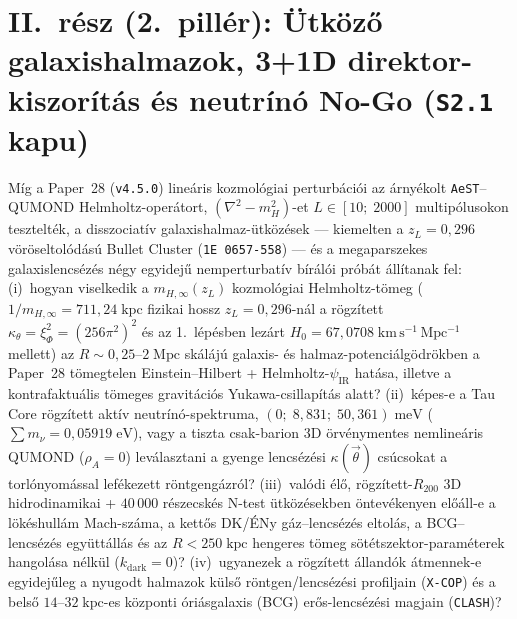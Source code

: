 \documentclass[11pt,a4paper]{article}
\begin{document}
\section{II.~rész (2.~pillér): Ütköző galaxishalmazok, 3+1D direktor-kiszorítás és neutrínó No-Go (\texttt{S2.1} kapu)}
\label{sec:step2-intro-hu}
Míg a Paper~28 (\texttt{v4.5.0}) lineáris kozmológiai perturbációi az árnyékolt \texttt{AeST}--QUMOND Helmholtz-operátort, $(\nabla^2 - m_H^2)$-et $L \in [10;\; 2000]$ multipólusokon tesztelték, a disszociatív galaxishalmaz-ütközések --- kiemelten a $z_L = 0{,}296$ vöröseltolódású Bullet Cluster (\texttt{1E~0657-558}) \cite{Markevitch2004,Clowe2006,Bradac2006,Randall2008,Cha2024} --- és a megaparszekes galaxislencsézés \cite{Mistele2024} négy egyidejű nemperturbatív bírálói próbát állítanak fel:
(i)~hogyan viselkedik a $m_{H,\infty}(z_L)$ kozmológiai Helmholtz-tömeg ($1/m_{H,\infty} = 711{,}24\;\mathrm{kpc}$ fizikai hossz $z_L = 0{,}296$-nál a rögzített $\kappa_\theta = \xi_\Phi^2 = (256\pi^2)^2$ és az 1.~lépésben lezárt $H_0 = 67{,}0708\;\mathrm{km\,s^{-1}\,Mpc^{-1}}$ mellett) az $R \sim 0{,}25\text{--}2\;\mathrm{Mpc}$ skálájú galaxis- és halmaz-potenciálgödrökben a Paper~28 tömegtelen Einstein--Hilbert + Helmholtz-$\psi_{\mathrm{IR}}$ hatása, illetve a kontrafaktuális tömeges gravitációs Yukawa-csillapítás alatt?
(ii)~képes-e a Tau Core rögzített aktív neutrínó-spektruma, $(0;\; 8{,}831;\; 50{,}361)\;\mathrm{meV}$ ($\sum m_\nu = 0{,}05919\;\mathrm{eV}$), vagy a tiszta csak-barion 3D örvénymentes nemlineáris QUMOND ($\rho_A = 0$) leválasztani a gyenge lencsézési $\kappa(\vec{\theta})$ csúcsokat a torlónyomással lefékezett röntgengázról?
(iii)~valódi élő, rögzített-$R_{200}$ 3D hidrodinamikai + $40\,000$ részecskés N-test ütközésekben öntevékenyen előáll-e a lökéshullám Mach-száma, a kettős DK/ÉNy gáz--lencsézés eltolás, a BCG--lencsézés együttállás és az $R < 250\;\mathrm{kpc}$ hengeres tömeg sötétszektor-paraméterek hangolása nélkül ($k_{\mathrm{dark}} = 0$)?
(iv)~ugyanezek a rögzített állandók átmennek-e egyidejűleg a nyugodt halmazok külső röntgen/lencsézési profiljain (\texttt{X-COP}) és a belső $14\text{--}32\;\mathrm{kpc}$-es központi óriásgalaxis (BCG) erős-lencsézési magjain (\texttt{CLASH})?
\end{document}
